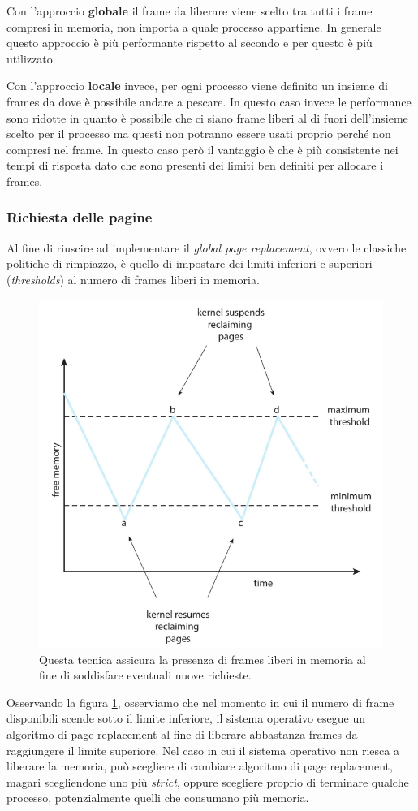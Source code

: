 Con l'approccio \textbf{globale} il frame da liberare viene scelto tra tutti i frame compresi in memoria, non importa a quale processo appartiene. In generale questo approccio è più performante rispetto al secondo e per questo è più utilizzato. 

Con l'approccio \textbf{locale} invece, per ogni processo viene definito un insieme di frames da dove è possibile andare a pescare. In questo caso invece le performance sono ridotte in quanto è possibile che ci siano frame liberi al di fuori dell'insieme scelto per il processo ma questi non potranno essere usati proprio perché non compresi nel frame. In questo caso però il vantaggio è che è più consistente nei tempi di risposta dato che sono presenti dei limiti ben definiti per allocare i frames. 

% 
\subsubsection{Richiesta delle pagine}
Al fine di riuscire ad implementare il \textit{global page replacement}, ovvero le classiche politiche di rimpiazzo, è quello di impostare dei limiti inferiori e superiori (\textit{thresholds}) al numero di frames liberi in memoria.
\begin{figure}[h]
    \centering
    \includegraphics[width = .5\textwidth]{../res/imgs/virtual memory/reclaming_pages.png}
    \caption{Questa tecnica assicura la presenza di frames liberi in memoria al fine di soddisfare eventuali nuove richieste.} 
    \label{fig:reclaming_pages}
\end{figure}
Osservando la figura \ref{fig:reclaming_pages}, osserviamo che nel momento in cui il numero di frame disponibili scende sotto il limite inferiore, il sistema operativo esegue un algoritmo di page replacement al fine di liberare abbastanza frames da raggiungere il limite superiore. Nel caso in cui il sistema operativo non riesca a liberare la memoria, può scegliere di cambiare algoritmo di page replacement, magari scegliendone uno più \textit{strict}, oppure scegliere proprio di terminare qualche processo, potenzialmente quelli che consumano più memoria.

